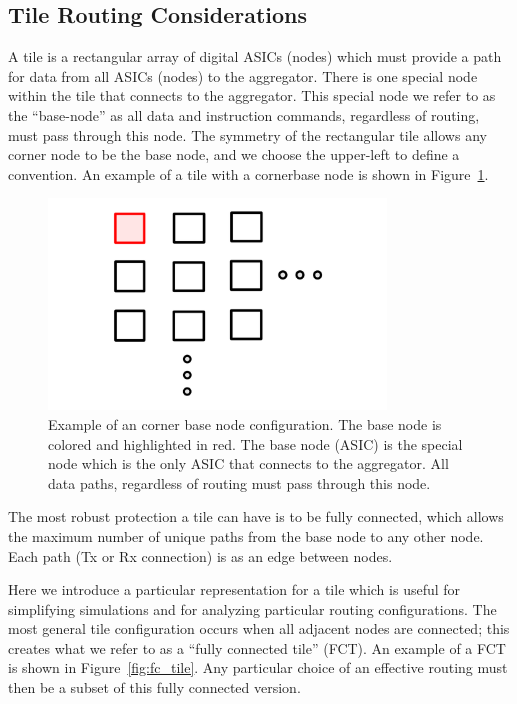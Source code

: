 \subsection{Tile Routing Considerations}\label{sec:tile_sim}
A tile is a rectangular array of digital ASICs (nodes) which must provide a path for data from all ASICs (nodes) to the aggregator.
There is one special node within the tile that connects to the aggregator.
This special node we refer to as the ``base-node'' as all data and instruction commands, regardless of routing, must pass through this node.
The symmetry of the rectangular tile allows any corner node to be the base node, and we choose the upper-left to define a convention.
An example of a tile with a cornerbase node is shown in Figure~\ref{fig:cbn}.

\begin{figure}[]
\centering
\includegraphics[width=0.8\textwidth]{images/CBN.pdf}
\caption{Example of an corner base node configuration.
The base node is colored and highlighted in red.
The base node (ASIC) is the special node which is the only ASIC that connects to the aggregator. 
All data paths, regardless of routing must pass through this node.
}
\label{fig:cbn}
\end{figure}

The most robust protection a tile can have is to be fully connected, which allows the maximum number of unique paths from the base node to any other node.
Each path (Tx or Rx connection) is as an edge between nodes.

Here we introduce a particular representation for a tile which is useful for simplifying simulations and for analyzing particular routing configurations.
The most general tile configuration occurs when all adjacent nodes are connected; this creates what we refer to as a ``fully connected tile'' (FCT).
An example of a FCT is shown in Figure~\ref{fig:fc_tile}.
Any particular choice of an effective routing must then be a subset of this fully connected version.

